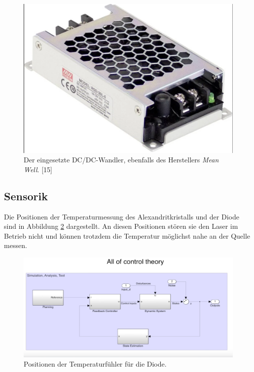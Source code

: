 \begin{figure}[H]
    \centering
    \includegraphics[scale=0.25, trim={1mm 1mm 1mm 1mm}, clip]{98_images/mean_well_dc_dc_converter.PNG}  
    \caption{Der eingesetzte DC/DC-Wandler, ebenfalls des Herstellers \textit{Mean Well}. [15]}
    \label{fig:dc_dc_wandler_hw}
\end{figure}

\subsection{Sensorik}
Die Positionen der Temperaturmessung des Alexandritkristalls und der Diode sind in Abbildung \ref{fig:temp_measurement_hw_1} dargestellt. An diesen Positionen stören sie den Laser im Betrieb nicht und können trotzdem die Temperatur möglichst nahe an der Quelle messen.\\

\begin{figure}[H]
    \centering
    \includegraphics[scale=0.2]{98_images/all_control_theory.PNG}
    \caption{Positionen der Temperaturfühler für die Diode.}
    \label{fig:temp_measurement_hw_1}
\end{figure}

